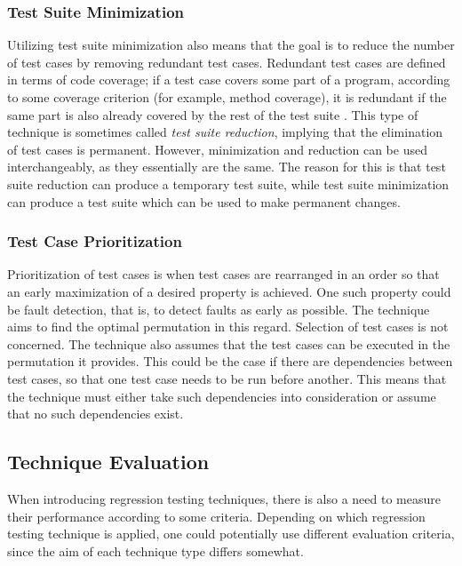 \documentclass[a4paper,english,12pt]{report}
\begin{document}
\subsubsection{Test Suite Minimization}
Utilizing test suite minimization also means that the goal is to reduce the number of test cases by removing redundant test cases. Redundant test cases are defined in terms of code coverage; if a test case covers some part of a program, according to some coverage criterion (for example, method coverage), it is redundant if the same part is also already covered by the rest of the test suite \citep{wong1995effect}. This type of technique is sometimes called \textit{test suite reduction}, implying that the elimination of test cases is permanent. However, minimization and reduction can be used interchangeably, as they essentially are the same. The reason for this is that test suite reduction can produce a temporary test suite, while test suite minimization can produce a test suite which can be used to make permanent changes. \citep[p. 69]{yoo2012regression}

\subsubsection{Test Case Prioritization}
Prioritization of test cases is when test cases are rearranged in an order so that an early maximization of a desired property is achieved. One such property could be fault detection, that is, to detect faults as early as possible. The technique aims to find the optimal permutation in this regard. Selection of test cases is not concerned. The technique also assumes that the test cases can be executed in the permutation it provides. This could be the case if there are dependencies between test cases, so that one test case needs to be run before another. This means that the technique must either take such dependencies into consideration or assume that no such dependencies exist.

\subsection{Technique Evaluation}\label{sec:technique-evaluation}
When introducing regression testing techniques, there is also a need to measure their performance according to some criteria. Depending on which regression testing technique is applied, one could potentially use different evaluation criteria, since the aim of each technique type differs somewhat.
\end{document}
